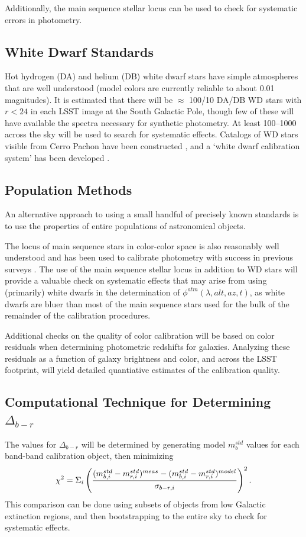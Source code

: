 \documentclass[12pt,preprint]{aastex}
\begin{document}
Additionally, the main sequence stellar locus can be used to check for systematic errors in 
photometry.

\subsection{White Dwarf Standards}
Hot hydrogen (DA) and helium (DB) white dwarf stars have simple
atmospheres that are well understood (model colors are
currently reliable to about 0.01 magnitudes). It is estimated that
there will be $\approx$ 100/10 DA/DB WD stars with $r<24$ in each LSST
image at the South Galactic Pole, though few of these will have available
the spectra necessary for synthetic photometry. At least
100--1000 across the sky will be used to search for systematic effects.
Catalogs of WD stars visible from Cerro Pachon have been constructed
\citep{1992JRASC..86..309B, 2004AJ....128.3053B}, and a `white dwarf
calibration system' has been developed
\citep{2006AJ....132.1221H}.  

\subsection{Population Methods}
An alternative approach to using a small handful of precisely known standards
is to use the properties of entire populations of astronomical objects.

The locus of main sequence stars in
color-color space is also reasonably well understood and has been used
to calibrate photometry with success in previous surveys
\citep{2004MNRAS.352.1255M, Ivezic2007, High09}.
The use of the main
sequence stellar locus in addition to WD stars will provide a valuable
check on systematic effects that may arise from using (primarily)
white dwarfs in the determination of $\phi^{atm}(\lambda,alt,az,t)$,
as white dwarfs are bluer than most of the main sequence stars used
for the bulk of the remainder of the calibration procedures.

Additional checks on the quality of color calibration will be based on
color residuals when determining photometric redshifts for
galaxies. Analyzing these residuals as a function of galaxy brightness
and color, and across the LSST footprint, will yield detailed
quantiative estimates of the calibration quality.  

\subsection{Computational Technique for Determining $\Delta_{b-r}$}
The values for $\Delta_{b-r}$ will be determined by generating model
$m_b^{std}$ values for each band-band calibration object, then
minimizing 
\begin{equation}
\chi^2 = \Sigma_{i} \left( { (m_{b,i}^{std} - m_{r,i}^{std})^{meas} - (m_{b,i}^{std}
    - m_{r,i}^{std})^{model} \over  \sigma_{b-r,i}}\right) ^2. 
\end{equation}
This comparison can
be done using subsets of objects from low Galactic extinction regions,
and then bootstrapping to the entire sky to check for systematic
effects. 
\end{document}
